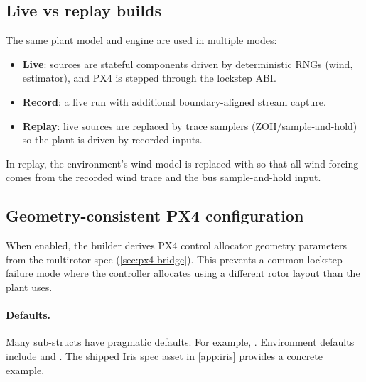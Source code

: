 \subsection{Live vs replay builds}

The same plant model and engine are used in multiple modes:
\begin{itemize}[leftmargin=*,itemsep=2pt]
  \item \textbf{Live}: sources are stateful components driven by deterministic RNGs (wind, estimator), and PX4 is stepped through the lockstep ABI.
  \item \textbf{Record}: a live run with additional boundary-aligned stream capture.
  \item \textbf{Replay}: live sources are replaced by trace samplers (ZOH/sample-and-hold) so the plant is driven by recorded inputs.
\end{itemize}
In replay, the environment's wind model is replaced with  so that all wind forcing comes from the recorded wind trace and the bus sample-and-hold input.

\subsection{Geometry-consistent PX4 configuration}

When enabled, the builder derives PX4 control allocator geometry parameters from the multirotor spec (\cref{sec:px4-bridge}). This prevents a common lockstep failure mode where the controller allocates using a different rotor layout than the plant uses.

\paragraph{Defaults.}
{\raggedright
Many  sub-structs have pragmatic defaults. For example, . Environment defaults include  and . The shipped Iris spec asset in \cref{app:iris} provides a concrete example.\par}
